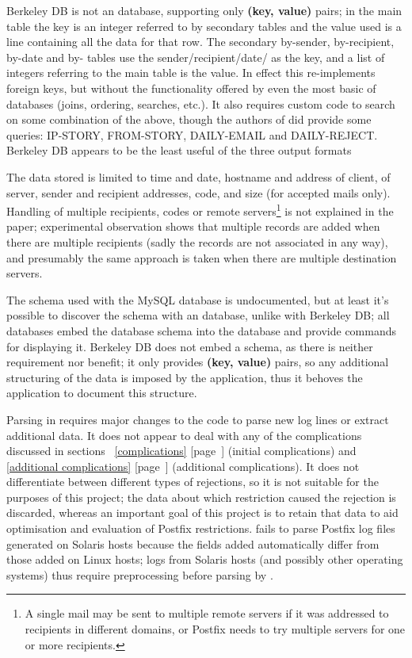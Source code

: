 \documentclass[a4paper,12pt,draft]{article}
\newcommand{\refwithpage}[1]{%
    \empty{}\ref{#1} [page~\pageref{#1}]%
}
\begin{document}
Berkeley DB is not an \SQL{} database, supporting only \textbf{(key,
value)} pairs; in the main table the key is an integer referred to by
secondary tables and the value used is a \CSV{} line containing all the
data for that row.  The secondary by-sender, by-recipient, by-date and
by-\IP{} tables use the sender/recipient/date/\IP{} as the key, and a
\CSV{} list of integers referring to the main table is the value.  In
effect this re-implements \SQL{} foreign keys, but without the
functionality offered by even the most basic of \SQL{} databases (joins,
ordering, searches, etc.).  It also requires custom code to search on some
combination of the above, though the authors of \LMA{} did provide some
queries: IP-STORY, FROM-STORY, DAILY-EMAIL and DAILY-REJECT\@.  Berkeley DB
appears to be the least useful of the three output formats

The data stored is limited to time and date, hostname and \IP{} address of
client, \IP{} of server, sender and recipient addresses, \SMTP{} code, and
size (for accepted mails only).  Handling of multiple recipients, \SMTP{}
codes or remote servers\footnote{A single mail may be sent to multiple
remote servers if it was addressed to recipients in different domains, or
Postfix needs to try multiple servers for one or more recipients.} is not
explained in the paper; experimental observation shows that multiple
records are added when there are multiple recipients (sadly the records are
not associated in any way), and presumably the same approach is taken when
there are multiple destination servers.

The schema used with the MySQL database is undocumented, but at least it's
possible to discover the schema with an \SQL{} database, unlike with
Berkeley DB\@; all \SQL{} databases embed the database schema into the
database and provide commands for displaying it.  Berkeley DB does not
embed a schema, as there is neither requirement nor benefit; it only
provides \textbf{(key, value)} pairs, so any additional structuring of the
data is imposed by the application, thus it behoves the application to
document this structure.

Parsing in \LMA{} requires major changes to the code to parse new log lines
or extract additional data.  It does not appear to deal with any of the
complications discussed in sections~\refwithpage{complications} (initial
complications) and~\refwithpage{additional complications} (additional
complications).  It does not differentiate between different types of
rejections, so it is not suitable for the purposes of this project; the
data about which restriction caused the rejection is discarded, whereas an
important goal of this project is to retain that data to aid optimisation
and evaluation of Postfix restrictions.  \LMA{} fails to parse Postfix log
files generated on Solaris hosts because the fields added automatically
differ from those added on Linux hosts; logs from Solaris hosts (and
possibly other operating systems) thus require preprocessing before parsing
by \LMA{}.
\end{document}
